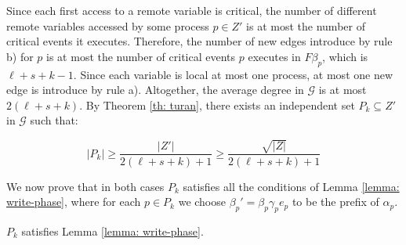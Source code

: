 Since each first access to a remote variable is critical, the number of different remote variables accessed by some process $p \in Z'$ is at most the number of critical events it executes. Therefore, the number of new edges introduce by rule b) for $p$ is at most the number of critical events $p$ executes in $F \beta_p$, which is $\ell+s+k-1$. Since each variable is local at most one process, at most one new edge is introduce by rule a).
Altogether, the average degree in $\mathcal{G}$ is at most $2(\ell+s+k)$. By Theorem \ref{th: turan}, there exists an independent set $P_k \subseteq Z'$ in $\mathcal{G}$ such that:

$$ |P_k| \geq \frac{|Z'|}{2(\ell+s+k)+1} \geq \frac{\sqrt{|Z|}}{2(\ell+s+k)+1}$$

We now prove that in both cases $P_k$ satisfies all the conditions of Lemma \ref{lemma: write-phase}, where for each $p \in P_k$ we choose $\beta_p' = \beta_p \gamma_p e_p$ to be the prefix of $\alpha_p$.

\begin{claim-subsection}
	$P_k$ satisfies Lemma \ref{lemma: write-phase}.
\end{claim-subsection}
 
